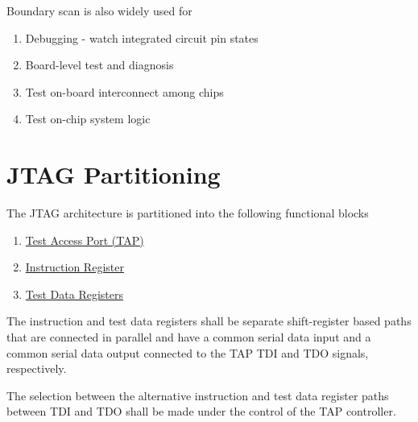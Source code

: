 Boundary scan is also widely used for 
\begin{enumerate}
    \item Debugging - watch integrated circuit pin states
    \item Board-level test and diagnosis
    \item Test on-board interconnect among chips
    \item Test on-chip system logic
\end{enumerate}

\section{JTAG Partitioning}
\label{sec:jtag-partitioning}

 The JTAG architecture is partitioned into the following functional blocks
\begin{enumerate}
    \item \hyperref[chap:TAP]{Test Access Port (TAP)}
    \item \hyperref[chap:instruction-reg]{Instruction Register}
    \item \hyperref[chap:data-reg]{Test Data Registers}
\end{enumerate}

The instruction and test data registers shall be separate shift-register based paths that are connected in parallel and have a common serial data input and a common serial data output connected to the TAP TDI and TDO signals, respectively. 

The selection between the alternative instruction and test data register paths between TDI and TDO shall be made under the control of the TAP controller.